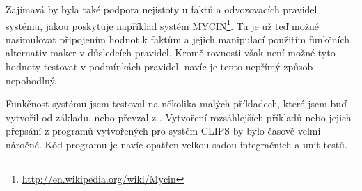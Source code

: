 Zajímavá by byla také podpora nejistoty u faktů a odvozovacích pravidel
systému, jakou poskytuje například systém
MYCIN\footnote{\url{http://en.wikipedia.org/wiki/Mycin}}. Tu je už teď možné
nasimulovat připojením hodnot k faktům a jejich manipulací použitím funkčních
alternativ maker v důsledcích pravidel. Kromě rovnosti však není možné tyto
hodnoty testovat v podmínkách pravidel, navíc je tento nepřímý způsob
nepohodlný.

Funkčnost systému jsem testoval na několika malých příkladech, které jsem buď
vytvořil od základu, nebo převzal z \cite{paradigms}. Vytvoření rozsáhlejších
příkladů nebo jejich přepsání z programů vytvořených pro systém CLIPS by bylo
časově velmi náročné. Kód programu je navíc opatřen velkou sadou integračních a
unit testů.
